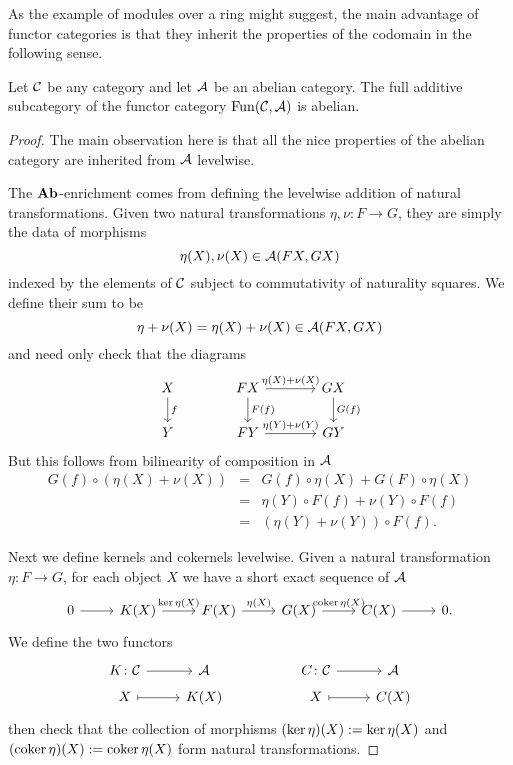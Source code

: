\documentclass[reqno, 12pt]{amsart}
\begin{document}
As the example of modules over a ring might suggest, the main advantage of functor categories is that they inherit the properties of the codomain in the following sense.

\begin{proposition}\label{prop: functor cats to ab are ab}
  Let $\mathcal{C}$ be any category and let $\mathcal{A}$ be an abelian category.
  The full additive subcategory of the functor category $\operatorname{Fun}(\mathcal{C},\mathcal{A})$ is abelian.
\end{proposition}

\begin{proof}
  The main observation here is that all the nice properties of the abelian category are inherited from $\mathcal{A}$ levelwise.

  The $\operatorname{\bf Ab}$-enrichment comes from defining the levelwise addition of natural transformations.
  Given two natural transformations $\eta,\nu \colon F \to G$, they are simply the data of morphisms
  $$\eta(X), \nu(X) \in \mathcal{A}(FX,GX)$$
  indexed by the elements of $\mathcal{C}$ subject to commutativity of naturality squares.
  We define their sum to be
  $$\eta + \nu(X) = \eta(X) + \nu(X) \in \mathcal{A}(FX,GX)$$
  and need only check that the diagrams
  $$\begin{tikzcd}[column sep=large]
    X \arrow{d}{f} & FX \arrow{d}{F(f)}\arrow{r}{\eta(X) + \nu(X)} & GX\arrow{d}{G(f)}\\
    Y & FY \arrow{r}{\eta(Y) + \nu(Y)} & GY
  \end{tikzcd}$$
  But this follows from bilinearity of composition in $\mathcal{A}$
  \begin{eqnarray*}
    G(f) \circ (\eta(X) + \nu(X)) &=& G(f) \circ \eta(X) + G(F) \circ \eta(X)\\
    &=& \eta(Y) \circ F(f) + \nu(Y) \circ F(f)\\
    &=& \left(\eta(Y) + \nu(Y)\right) \circ F(f).
  \end{eqnarray*}

  Next we define kernels and cokernels levelwise.
  Given a natural transformation $\eta \colon F \to G$, for each object $X$ we have a short exact sequence of $\mathcal{A}$
  $$\begin{tikzcd}
    0 \arrow{r} & K(X) \arrow{r}{\op{ker} \eta(X)} & F(X) \arrow{r}{\eta(X)} & G(X) \arrow{r}{\op{coker} \eta(X)} & C(X) \arrow{r} & 0.
  \end{tikzcd}$$
  We define the two functors
  $$\begin{tikzcd}[row sep=tiny]
    K \colon \C \arrow{r}& \A & & C \colon \C \arrow{r} & \A\\
    X \arrow[mapsto]{r}& K(X) & & X \arrow[mapsto]{r} & C(X)
  \end{tikzcd}$$
  then check that the collection of morphisms $(\operatorname{ker} \eta)(X) := \operatorname{ker} \eta(X)$ and $(\operatorname{coker} \eta)(X) := \operatorname{coker} \eta(X)$ form natural transformations.


\end{proof}
\end{document}

